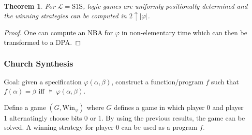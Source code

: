\documentclass{article}
\newtheorem{theorem}{Theorem}
\begin{document}
\begin{theorem}
	For $\mathcal{L} = \text{S1S}$, logic games are uniformly positionally determined and the winning strategies can be computed in $2 \uparrow |\varphi|$.
\end{theorem}
\begin{proof}
	One can compute an NBA for $\varphi$ in non-elementary time which can then be transformed to a DPA.
\end{proof}

\subsubsection{Church Synthesis}
Goal: given a specification $\varphi(\alpha, \beta)$, construct a function/program $f$ such that $f(\alpha) = \beta $ iff $\models~\varphi(\alpha, \beta)$.

Define a game $(G, \text{Win}_\varphi)$ where $G$ defines a game in which player 0 and player 1 alternatingly choose bits 0 or 1. By using the previous results, the game can be solved. A winning strategy for player 0 can be used as a program $f$.
\end{document}
